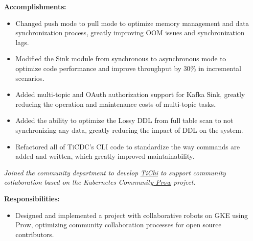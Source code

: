 \documentclass{software_engineer_rustin_liu}
\newcommand{\en}[1]{#1}
\newcommand{\zh}[1]{}
\begin{document}
\en{\textbf{Accomplishments:}}
\zh{\textbf{产出：}}
\begin{itemize}
      \item \en{Changed push mode to pull mode to optimize memory management and data synchronization process, greatly improving OOM issues and synchronization lags.}
            \zh{将推送模式修改为了拉取模式优化了内存管理和数据同步流程，极大的改善了 OOM 问题和同步延迟。}
      \item \en{Modified the Sink module from synchronous to asynchronous mode to optimize code performance and improve throughput by 30\% in incremental scenarios.}
            \zh{将 Sink 模块从同步模式修改为异步模式，优化代码性能，将增量场景下吞吐提升 30\%。}
      \item \en{ Added multi-topic and OAuth authorization support for Kafka Sink, greatly reducing the operation and maintenance costs of multi-topic tasks.}
            \zh{为 Kafka Sink 支持了多 Topic 和 OAuth 授权功能，极大的降低了多 Topic 的任务运维成本。}
      \item \en{Added the ability to optimize the Lossy DDL from full table scan to not synchronizing any data, greatly reducing the impact of DDL on the system.}
            \zh{将有损 DDL 从全表扫描优化为不同步任何数据，极大的降低了有损 DDL 对系统的影响。}
      \item \en{Refactored all of TiCDC's CLI code to standardize the way commands are added and written, which greatly improved maintainability.}
            \zh{重构了 TiCDC 的 CLI 所有代码，标准化了命令添加和编写方式，极大提升了可维护性。}
\end{itemize}

\en{}
\zh{\datedsubsection{\textbf{\href{https://pingcap.com/zh/}{PingCAP Inc. - 数据库 - 前后端开发工程师（Golang/JS）}}}{2020/08 -- 2021/07}}
\en{\textsl{Joined the community department to develop {\href{https://github.com/ti-community-infra/tichi}{TiChi}} to support community collaboration based on the Kubernetes Community{\href{https://github.com/kubernetes/test-infra/tree/master/prow}{ Prow}} project.}}
\zh{\textsl{加入了社区部门，以 Kubernetes 社区{\href{https://github.com/kubernetes/test-infra/tree/master/prow}{ Prow}} 项目为基础开发{\href{https://github.com/ti-community-infra/tichi}{ TiChi}} 来支撑社区协作。}}

\en{\textbf{Responsibilities:}}
\zh{\textbf{职责：}}
\begin{itemize}
      \item \en{Designed and implemented a project with collaborative robots on GKE using Prow, optimizing community collaboration processes for open source contributors.}
            \zh{使用 Prow 在 GKE 上设计和实现一个协作机器人项目，优化开源贡献者的社区协作流程。}
\end{itemize}
\end{document}
